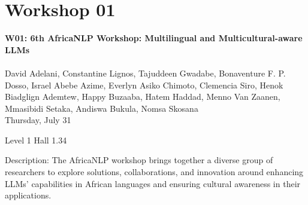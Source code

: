 
\clearpage



\section[W01: 6th AfricaNLP Workshop: Multilingual and Multicultural-aware LLMs]{Workshop 01}
\label{workshop_1}

\begin{center}
    {\Large \textbf{W01: 6th AfricaNLP Workshop: Multilingual and Multicultural-aware LLMs}}\\
    \\

    David Adelani, Constantine Lignos, Tajuddeen Gwadabe, Bonaventure F. P. Dosso, Israel Abebe Azime, Everlyn Asiko Chimoto, Clemencia Siro, Henok Biadglign Ademtew, Happy Buzaaba, Hatem Haddad, Menno Van Zaanen, Mmasibidi Setaka, Andiswa Bukula, Nomsa Skosana
\\
    Thursday, July 31
    
    Level 1 Hall 1.34

\end{center}

Description: The AfricaNLP workshop brings together a diverse group of researchers to explore solutions, collaborations, and innovation around enhancing LLMs’ capabilities in African languages and ensuring cultural awareness in their applications. 

